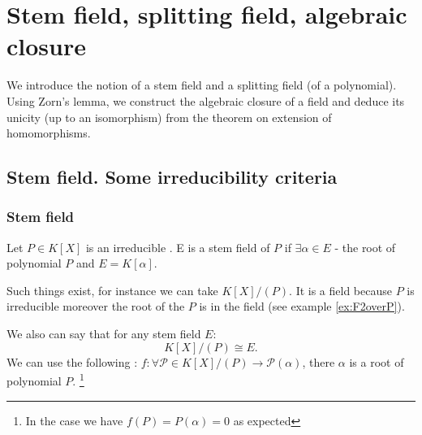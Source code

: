 \chapter{Stem field, splitting field, algebraic closure}
We introduce the notion of a stem field and a splitting field (of a
polynomial). Using Zorn's lemma, we construct the algebraic closure of
a field and deduce its unicity (up to an isomorphism) from the theorem
on extension of homomorphisms.

\section{Stem field. Some irreducibility criteria}

\subsection{Stem field}

\begin{definition}
Let $P \in K\left[X\right]$ is an irreducible
.  E is a stem
field of $P$ if $\exists \alpha \in E$ - the root of polynomial
$P$ and $E = K\left[\alpha\right]$.
\label{def:stemfield}
\end{definition}

Such things exist, for instance we can take
$K\left[X\right]/\left(P\right)$. It is a field because $P$ is
irreducible moreover the root of the $P$ is in the field (see example
\ref{ex:F2overP}).

We also can say that for any stem field $E$:
\[
K\left[X\right]/\left(P\right) \cong E.
\]
We can use the following :
$f: \forall \mathcal{P} \in K\left[X\right]/\left(P\right) \rightarrow
\mathcal{P}(\alpha)$, there $\alpha$ is a root of polynomial $P$.
\footnote{
  In the case we have $f(P) = P(\alpha) = 0$ as expected
}

